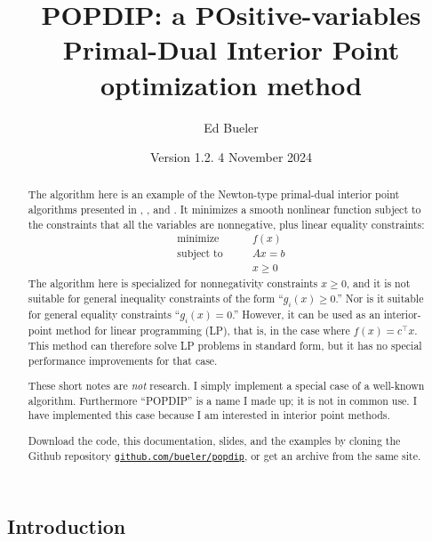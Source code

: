 \documentclass[11pt]{article}
\title{POPDIP: a POsitive-variables \\ Primal-Dual Interior Point optimization method}
\author{Ed Bueler}
\date{Version 1.2.  4 November 2024}
\begin{document}
\maketitle

\begin{abstract}
The algorithm here is an example of the Newton-type primal-dual interior point algorithms presented in \cite[section 16.7]{GrivaNashSofer2009}, \cite[chapter 19]{NocedalWright2006}, and \cite{YamashitaYabe1996}.  It minimizes a smooth nonlinear function subject to the constraints that all the variables are nonnegative, plus linear equality constraints:
\begin{equation}
\begin{matrix}
\text{minimize} \qquad   & f(x) \\
\text{subject to} \qquad & A x = b \\
                         & x \ge 0
\end{matrix} \label{eq:problem}
\end{equation}
The algorithm here is specialized for nonnegativity constraints $x\ge 0$, and it is not suitable for general inequality constraints of the form ``$g_i(x)\ge 0$.''  Nor is it suitable for general equality constraints ``$g_i(x)=0$.''  However, it can be used as an interior-point method for linear programming (LP), that is, in the case where $f(x)=c^\top x$.  This method can therefore solve LP problems in standard form, but it has no special performance improvements for that case.

These short notes are \emph{not} research.  I simply implement a special case of a well-known algorithm.  Furthermore ``POPDIP'' is a name I made up; it is not in common use.  I have implemented this case because I am interested in interior point methods.

Download the code, this documentation, slides, and the examples by cloning the Github repository \href{https://github.com/bueler/popdip}{\texttt{github.com/bueler/popdip}},
or get an archive from the same site.\end{abstract}

\thispagestyle{empty}

\bigskip
\subsection*{Introduction}
\end{document}
